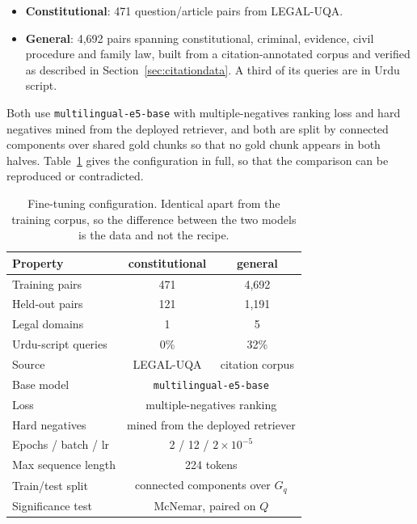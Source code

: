 \documentclass[conference]{IEEEtran}
\begin{document}
\begin{itemize}
\item \textbf{Constitutional}: 471 question/article pairs from LEGAL-UQA.
\item \textbf{General}: 4{,}692 pairs spanning constitutional, criminal,
evidence, civil procedure and family law, built from a citation-annotated corpus
and verified as described in Section~\ref{sec:citationdata}. A third of its
queries are in Urdu script.
\end{itemize}

Both use \texttt{multilingual-e5-base} with multiple-negatives ranking loss and
hard negatives mined from the deployed retriever, and both are split by connected
components over shared gold chunks so that no gold chunk appears in both halves.
Table~\ref{tab:setup} gives the configuration in full, so that the comparison
can be reproduced or contradicted.

\begin{table}[t]
\caption{Fine-tuning configuration. Identical apart from the training corpus,
so the difference between the two models is the data and not the recipe.}
\label{tab:setup}
\centering
\small
\begin{tabular}{@{}lcc@{}}
\toprule
Property & constitutional & general \\
\midrule
Training pairs        & 471 & 4{,}692 \\
Held-out pairs        & 121 & 1{,}191 \\
Legal domains         & 1 & 5 \\
Urdu-script queries   & 0\% & 32\% \\
Source                & LEGAL-UQA & citation corpus \\
\midrule
Base model            & \multicolumn{2}{c}{\texttt{multilingual-e5-base}} \\
Loss                  & \multicolumn{2}{c}{multiple-negatives ranking} \\
Hard negatives        & \multicolumn{2}{c}{mined from the deployed retriever} \\
Epochs / batch / lr   & \multicolumn{2}{c}{2 / 12 / $2\times10^{-5}$} \\
Max sequence length   & \multicolumn{2}{c}{224 tokens} \\
Train/test split      & \multicolumn{2}{c}{connected components over $G_q$} \\
Significance test     & \multicolumn{2}{c}{McNemar, paired on $Q$} \\
\bottomrule
\end{tabular}
\end{table}
\end{document}
